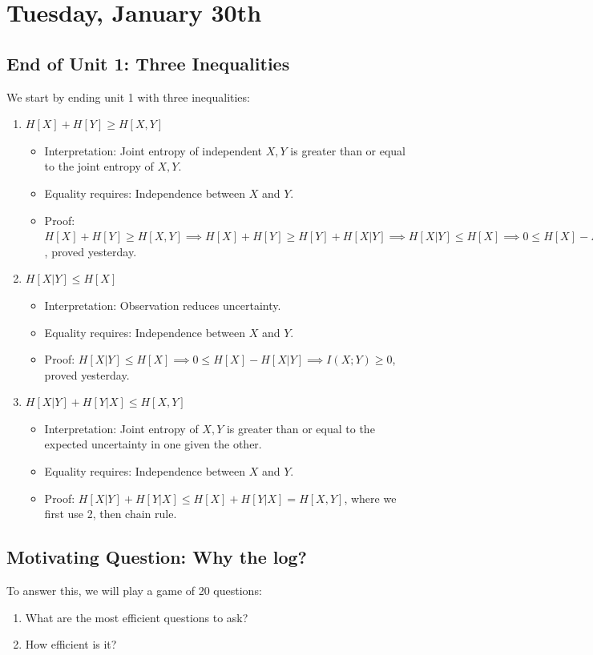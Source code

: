 \section{Tuesday, January 30th}
\subsection{End of Unit 1: Three Inequalities}
We start by ending unit 1 with three inequalities:
\begin{enumerate}
    \item \(H[X] + H[Y] \geq H[X, Y]\)
    \begin{itemize}
        \item Interpretation: Joint entropy of independent \(X, Y\) is greater than or equal to the joint entropy of \(X, Y\).
        \item Equality requires: Independence between \(X\) and \(Y\).
        \item Proof: \(H[X] + H[Y] \geq H[X, Y] \implies H[X] + H[Y] \geq H[Y] + H[X | Y] \implies H[X | Y] \leq H[X] \implies 0 \leq H[X] - H[X | Y] \implies I(X; Y) \geq 0\), proved yesterday.
    \end{itemize}
    \item \(H[X | Y] \leq H[X]\)
    \begin{itemize}
        \item Interpretation: Observation reduces uncertainty.
        \item Equality requires: Independence between \(X\) and \(Y\).
        \item Proof: \(H[X | Y] \leq H[X] \implies 0 \leq H[X] - H[X | Y] \implies I(X; Y) \geq 0\), proved yesterday.
    \end{itemize}
    \item \(H[X | Y] + H[Y | X] \leq H[X, Y]\)
    \begin{itemize}
        \item Interpretation: Joint entropy of \(X, Y\) is greater than or equal to the expected uncertainty in one given the other.
        \item Equality requires: Independence between \(X\) and \(Y\).
        \item Proof: \(H[X | Y] + H[Y | X] \leq H[X] + H[Y | X] = H[X, Y]\), where we first use 2, then chain rule.
    \end{itemize}
\end{enumerate}

\subsection{Motivating Question: Why the log?}
To answer this, we will play a game of 20 questions:
    \begin{enumerate}
        \item What are the most efficient questions to ask?
        \item How efficient is it?
    \end{enumerate}

